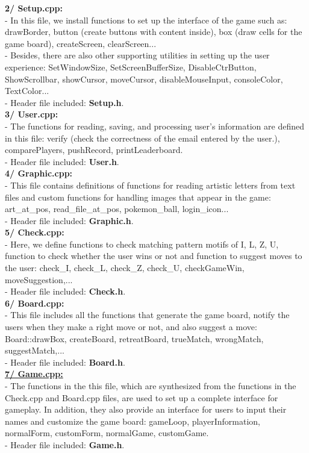\documentclass[12pt,a4paper]{report}
\begin{document}
\textbf{2/ Setup.cpp:}\\
- In this file, we install functions to set up the interface of the game such as: drawBorder, button (create buttons with content inside), box (draw cells for the game board), createScreen, clearScreen...\\
- Besides, there are also other supporting utilities in setting up the user experience: SetWindowSize, SetScreenBufferSize, DisableCtrButton, ShowScrollbar, showCursor, moveCursor, disableMouseInput, consoleColor, TextColor...\\
- Header file included: \textbf{Setup.h}.\\[0.4cm]
\textbf{3/ User.cpp:}\\
- The functions for reading, saving, and processing user's information are defined in this file: verify (check the correctness of the email entered by the user.), comparePlayers, pushRecord, printLeaderboard. \\
- Header file included: \textbf{User.h}.\\[0.4cm]
\textbf{4/ Graphic.cpp:}\\
- This file contains definitions of functions for reading artistic letters from text files and custom functions for handling images that appear in the game: art\_at\_pos, read\_file\_at\_pos, pokemon\_ball, login\_icon...\\
- Header file included: \textbf{Graphic.h}.\\[0.4cm]
\textbf{5/ Check.cpp:}\\
- Here, we define functions to check matching pattern motifs of I, L, Z, U, function to check whether the user wins or not and function to suggest moves to the user: check\_I, check\_L, check\_Z, check\_U, checkGameWin, moveSuggestion,...\\
- Header file included: \textbf{Check.h}.\\[0.4cm]
\textbf{6/ Board.cpp:}\\
- This file includes all the functions that generate the game board, notify the users when they make a right move or not, and also suggest a move: Board::drawBox, createBoard, retreatBoard, trueMatch, wrongMatch, suggestMatch,...\\
- Header file included: \textbf{Board.h}.\\[0.4cm]
\newpage
\hspace{-0.6cm}\textbf{\underline{7/ Game.cpp:}}\\[0.2cm]
- The functions in the this file, which are synthesized from the functions in the Check.cpp and Board.cpp files, are used to set up a complete interface for gameplay. In addition, they also provide an interface for users to input their names and customize the game board: gameLoop, playerInformation, normalForm, customForm, normalGame, customGame.\\
- Header file included: \textbf{Game.h}.\\[0.4cm]
\end{document}

